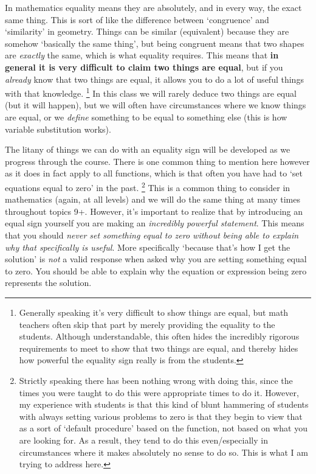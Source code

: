\documentclass{ximeraXloud}
\begin{document}
    In mathematics equality means they are absolutely, and in every way, the exact same thing. This is sort of like the difference between `congruence' and `similarity' in geometry. Things can be similar (equivalent) because they are somehow `basically the same thing', but being congruent means that two shapes are \textit{exactly} the same, which is what equality requires. This means that \textbf{in general it is very difficult to claim two things are equal}, but if you \textit{already} know that two things are equal, it allows you to do a lot of useful things with that knowledge.%
    \footnote{%
        Generally speaking it's very difficult to show things are equal, but math teachers often skip that part by merely providing the equality to the students. Although understandable, this often hides the incredibly rigorous requirements to meet to show that two things are equal, and thereby hides how powerful the equality sign really is from the students.%
        }
    In this class we will rarely deduce two things are equal (but it will happen), but we will often have circumstances where we know things are equal, or we \textit{define} something to be equal to something else (this is how variable substitution works).
    
    The litany of things we can do with an equality sign will be developed as we progress through the course. There is one common thing to mention here however as it does in fact apply to all functions, which is that often you have had to `set equations equal to zero' in the past.%
    \footnote{%
        Strictly speaking there has been nothing wrong with doing this, since the times you were taught to do this were appropriate times to do it. However, my experience with students is that this kind of blunt hammering of students with always setting various problems to zero is that they begin to view that as a sort of `default procedure' based on the function, not based on what you are looking for. As a result, they tend to do this even/especially in circumstances where it makes absolutely no sense to do so. This is what I am trying to address here.%
        }
    This is a common thing to consider in mathematics (again, at all levels) and we will do the same thing at many times throughout topics 9+. However, it's important to realize that by introducing an equal sign yourself you are making an \textit{incredibly powerful statement}. This means that you should \textit{never set something equal to zero without being able to explain why that specifically is useful}. More specifically `because that's how I get the solution' is \textit{not} a valid response when asked why you are setting something equal to zero. You should be able to explain why the equation or expression being zero represents the solution.
    
\end{document}
